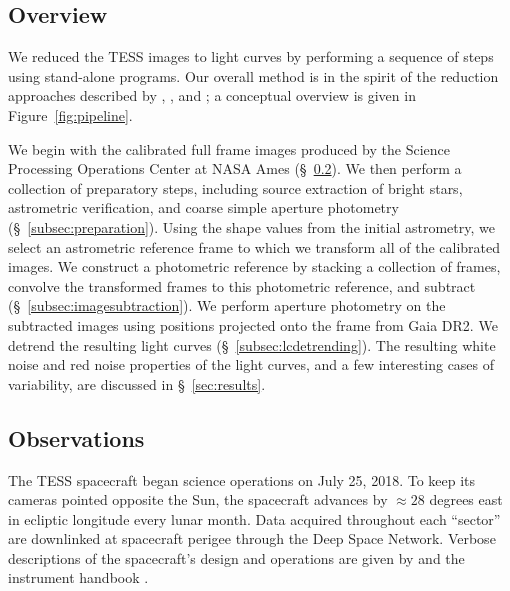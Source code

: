 \documentclass[12pt,twocolumn,tighten]{aastex62}
\begin{document}
\subsection{Overview}

We reduced the TESS images to light curves by performing a sequence of
steps using stand-alone programs.
Our overall method is in the spirit of the reduction approaches described
by \citet{Pal_2009}, \citet{huang_high-precision_2015}, \citet{soares-furtado_image_2017} and
\citet{oelkers_precision_2018}; a conceptual overview is given in
Figure~\ref{fig:pipeline}.

We begin with the calibrated full frame images produced by the Science
Processing Operations Center at NASA Ames (\S~\ref{subsec:observations}).
We then perform a collection of
preparatory steps, including source extraction of bright stars,
astrometric verification, and coarse simple aperture
photometry (\S~\ref{subsec:preparation}).  Using the shape values from
the initial astrometry, we select an astrometric reference frame to
which we transform all of the calibrated images.  We construct a
photometric reference by stacking a collection of frames,
convolve the transformed frames to this photometric reference, and
subtract (\S~\ref{subsec:imagesubtraction}).  We perform aperture
photometry on the subtracted images using positions projected onto the
frame from Gaia DR2.  
We detrend the resulting light curves
(\S~\ref{subsec:lcdetrending}).  The resulting white noise and red noise properties
of the light curves, and a few
interesting cases of variability, are discussed in \S~\ref{sec:results}.




\subsection{Observations}
\label{subsec:observations}


The TESS spacecraft began science operations on July 25, 2018.  To
keep its cameras pointed opposite the Sun, the spacecraft advances by
$\approx$$28$ degrees east in ecliptic longitude every lunar month.  Data
acquired throughout each ``sector'' are downlinked at spacecraft
perigee through the Deep Space Network.  Verbose descriptions of the
spacecraft's design and operations are given by
\citet{ricker_transiting_2015} and the instrument handbook
\citep{vanderspek_2018}.
\end{document}

